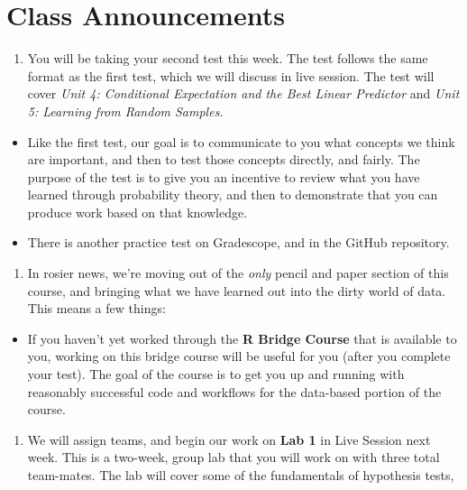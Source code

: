 \documentclass[
]{book}
\providecommand{\tightlist}{%
  \setlength{\itemsep}{0pt}\setlength{\parskip}{0pt}}
\theoremstyle{definition}
\theoremstyle{definition}
\theoremstyle{definition}
\theoremstyle{definition}
\theoremstyle{remark}
\begin{document}
\hypertarget{class-announcements-4}{%
\section{Class Announcements}\label{class-announcements-4}}

\begin{enumerate}
\def\labelenumi{\arabic{enumi}.}
\tightlist
\item
  You will be taking your second test this week. The test follows the same format as the first test, which we will discuss in live session. The test will cover \emph{Unit 4: Conditional Expectation and the Best Linear Predictor} and \emph{Unit 5: Learning from Random Samples.}
\end{enumerate}

\begin{itemize}
\tightlist
\item
  Like the first test, our goal is to communicate to you what concepts we think are important, and then to test those concepts directly, and fairly. The purpose of the test is to give you an incentive to review what you have learned through probability theory, and then to demonstrate that you can produce work based on that knowledge.
\item
  There is another practice test on Gradescope, and in the GitHub repository.
\end{itemize}

\begin{enumerate}
\def\labelenumi{\arabic{enumi}.}
\setcounter{enumi}{1}
\tightlist
\item
  In rosier news, we're moving out of the \emph{only} pencil and paper section of this course, and bringing what we have learned out into the dirty world of data. This means a few things:
\end{enumerate}

\begin{itemize}
\tightlist
\item
  If you haven't yet worked through the \textbf{R Bridge Course} that is available to you, working on this bridge course will be useful for you (after you complete your test). The goal of the course is to get you up and running with reasonably successful code and workflows for the data-based portion of the course.
\end{itemize}

\begin{enumerate}
\def\labelenumi{\arabic{enumi}.}
\setcounter{enumi}{2}
\tightlist
\item
  We will assign teams, and begin our work on \textbf{Lab 1} in Live Session next week. This is a two-week, group lab that you will work on with three total team-mates. The lab will cover some of the fundamentals of hypothesis tests,
\end{enumerate}
\end{document}
